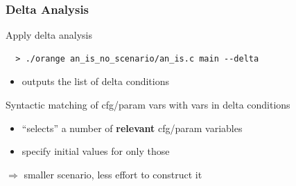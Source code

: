 \documentclass{beamer}
\begin{document}
\begin{frame}[fragile]
  \frametitle{Delta Analysis}

  \bigskip
  Apply delta analysis \\
  {\small
  \begin{verbatim}
  > ./orange an_is_no_scenario/an_is.c main --delta
  \end{verbatim}
  }
  \vspace{-.4cm}
  \begin{itemize}
    \item outputs the list of delta conditions
  \end{itemize}

  \bigskip
  Syntactic matching of cfg/param vars with vars in delta conditions 
  \begin{itemize}
    \item ``selects'' a number of {\bf relevant} cfg/param variables 
    \item specify initial values for only those
  \end{itemize}

  \bigskip
  $\Rightarrow$ smaller scenario, less effort to construct it
\end{frame} 
\end{document}
